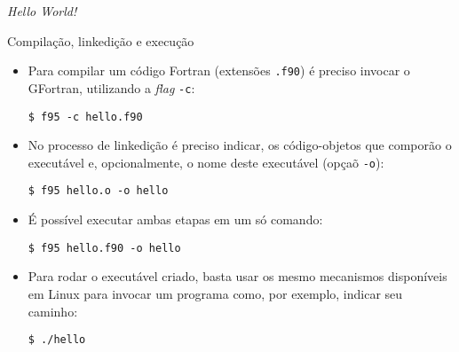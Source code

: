 \begin{frame}[fragile]{\it Hello World!}


\end{frame}

\begin{frame}[fragile]{Compilação, linkedição e execução}

    \begin{itemize}
        \item Para compilar um código Fortran (extensões \texttt{.f90})
            é preciso invocar o GFortran, utilizando a \textit{flag} \texttt{-c}:

        \begin{center}
            \verb|$ f95 -c hello.f90|
        \end{center}
        
        \item No processo de linkedição é preciso indicar, os código-objetos que comporão o 
            executável e, opcionalmente, o nome deste executável (opçaõ \texttt{-o}):

        \begin{center}
            \verb|$ f95 hello.o -o hello|
        \end{center}

        \item É possível executar ambas etapas em um só comando:
        \begin{center}
            \verb|$ f95 hello.f90 -o hello|
        \end{center}

        \item Para rodar o executável criado, basta usar os mesmo mecanismos disponíveis em Linux
            para invocar um programa como, por exemplo, indicar seu caminho:
        
        \begin{center}
            \verb|$ ./hello|
        \end{center}

    \end{itemize}

\end{frame}

